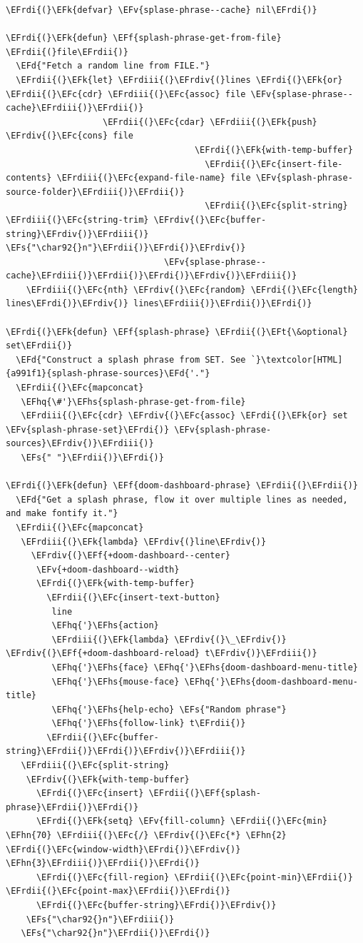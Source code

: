 \documentclass{scrartcl}
\newcommand{\EFk}[1]{\textcolor{EFk}{#1}} %
\newcommand{\EFd}[1]{\textcolor{EFd}{#1}} %
\newcommand{\EFt}[1]{\textcolor{EFt}{#1}} %
\newcommand{\EFs}[1]{\textcolor{EFs}{#1}} %
\newcommand{\EFc}[1]{\textcolor{EFc}{#1}} %
\newcommand{\EFv}[1]{\textcolor{EFv}{#1}} %
\newcommand{\EFf}[1]{\textcolor{EFf}{#1}} %
\newcommand{\EFhn}[1]{#1} %
\newcommand{\EFhq}[1]{#1} %
\newcommand{\EFhs}[1]{#1} %
\newcommand{\EFrdi}[1]{#1} %
\newcommand{\EFrdii}[1]{#1} %
\newcommand{\EFrdiii}[1]{#1} %
\newcommand{\EFrdiv}[1]{#1} %
\begin{document}
\begin{Code}
\begin{Verbatim}[]
\EFrdi{(}\EFk{defvar} \EFv{splase-phrase--cache} nil\EFrdi{)}

\EFrdi{(}\EFk{defun} \EFf{splash-phrase-get-from-file} \EFrdii{(}file\EFrdii{)}
  \EFd{"Fetch a random line from FILE."}
  \EFrdii{(}\EFk{let} \EFrdiii{(}\EFrdiv{(}lines \EFrdi{(}\EFk{or} \EFrdii{(}\EFc{cdr} \EFrdiii{(}\EFc{assoc} file \EFv{splase-phrase--cache}\EFrdiii{)}\EFrdii{)}
                   \EFrdii{(}\EFc{cdar} \EFrdiii{(}\EFk{push} \EFrdiv{(}\EFc{cons} file
                                     \EFrdi{(}\EFk{with-temp-buffer}
                                       \EFrdii{(}\EFc{insert-file-contents} \EFrdiii{(}\EFc{expand-file-name} file \EFv{splash-phrase-source-folder}\EFrdiii{)}\EFrdii{)}
                                       \EFrdii{(}\EFc{split-string} \EFrdiii{(}\EFc{string-trim} \EFrdiv{(}\EFc{buffer-string}\EFrdiv{)}\EFrdiii{)} \EFs{"\char92{}n"}\EFrdii{)}\EFrdi{)}\EFrdiv{)}
                               \EFv{splase-phrase--cache}\EFrdiii{)}\EFrdii{)}\EFrdi{)}\EFrdiv{)}\EFrdiii{)}
    \EFrdiii{(}\EFc{nth} \EFrdiv{(}\EFc{random} \EFrdi{(}\EFc{length} lines\EFrdi{)}\EFrdiv{)} lines\EFrdiii{)}\EFrdii{)}\EFrdi{)}

\EFrdi{(}\EFk{defun} \EFf{splash-phrase} \EFrdii{(}\EFt{\&optional} set\EFrdii{)}
  \EFd{"Construct a splash phrase from SET. See `}\textcolor[HTML]{a991f1}{splash-phrase-sources}\EFd{'."}
  \EFrdii{(}\EFc{mapconcat}
   \EFhq{\#'}\EFhs{splash-phrase-get-from-file}
   \EFrdiii{(}\EFc{cdr} \EFrdiv{(}\EFc{assoc} \EFrdi{(}\EFk{or} set \EFv{splash-phrase-set}\EFrdi{)} \EFv{splash-phrase-sources}\EFrdiv{)}\EFrdiii{)}
   \EFs{" "}\EFrdii{)}\EFrdi{)}

\EFrdi{(}\EFk{defun} \EFf{doom-dashboard-phrase} \EFrdii{(}\EFrdii{)}
  \EFd{"Get a splash phrase, flow it over multiple lines as needed, and make fontify it."}
  \EFrdii{(}\EFc{mapconcat}
   \EFrdiii{(}\EFk{lambda} \EFrdiv{(}line\EFrdiv{)}
     \EFrdiv{(}\EFf{+doom-dashboard--center}
      \EFv{+doom-dashboard--width}
      \EFrdi{(}\EFk{with-temp-buffer}
        \EFrdii{(}\EFc{insert-text-button}
         line
         \EFhq{'}\EFhs{action}
         \EFrdiii{(}\EFk{lambda} \EFrdiv{(}\_\EFrdiv{)} \EFrdiv{(}\EFf{+doom-dashboard-reload} t\EFrdiv{)}\EFrdiii{)}
         \EFhq{'}\EFhs{face} \EFhq{'}\EFhs{doom-dashboard-menu-title}
         \EFhq{'}\EFhs{mouse-face} \EFhq{'}\EFhs{doom-dashboard-menu-title}
         \EFhq{'}\EFhs{help-echo} \EFs{"Random phrase"}
         \EFhq{'}\EFhs{follow-link} t\EFrdii{)}
        \EFrdii{(}\EFc{buffer-string}\EFrdii{)}\EFrdi{)}\EFrdiv{)}\EFrdiii{)}
   \EFrdiii{(}\EFc{split-string}
    \EFrdiv{(}\EFk{with-temp-buffer}
      \EFrdi{(}\EFc{insert} \EFrdii{(}\EFf{splash-phrase}\EFrdii{)}\EFrdi{)}
      \EFrdi{(}\EFk{setq} \EFv{fill-column} \EFrdii{(}\EFc{min} \EFhn{70} \EFrdiii{(}\EFc{/} \EFrdiv{(}\EFc{*} \EFhn{2} \EFrdi{(}\EFc{window-width}\EFrdi{)}\EFrdiv{)} \EFhn{3}\EFrdiii{)}\EFrdii{)}\EFrdi{)}
      \EFrdi{(}\EFc{fill-region} \EFrdii{(}\EFc{point-min}\EFrdii{)} \EFrdii{(}\EFc{point-max}\EFrdii{)}\EFrdi{)}
      \EFrdi{(}\EFc{buffer-string}\EFrdi{)}\EFrdiv{)}
    \EFs{"\char92{}n"}\EFrdiii{)}
   \EFs{"\char92{}n"}\EFrdii{)}\EFrdi{)}


\end{Verbatim}
\end{Code}
\end{document}
